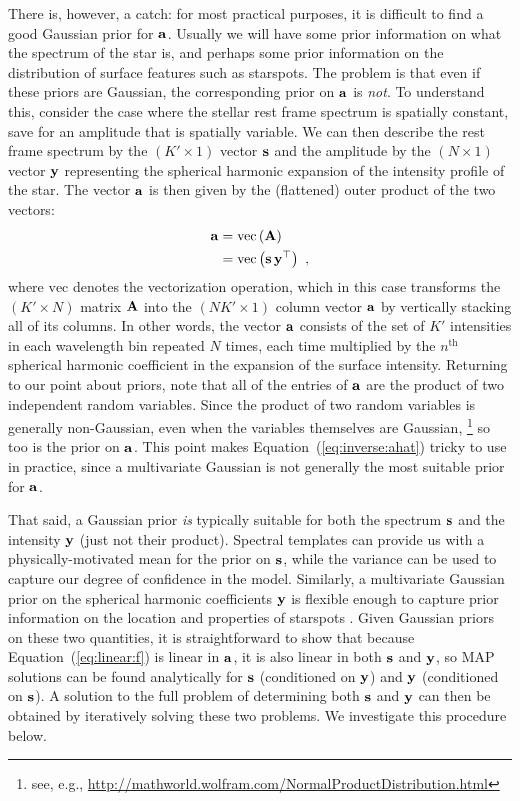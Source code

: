 \documentclass[modern]{aastex631}
\begin{document}
There is, however, a catch: for most practical purposes, it is difficult to find a good Gaussian prior for ${\mathbf{a}}$. 
Usually we will have some prior information on what the spectrum of the star is, and perhaps some prior information on the distribution of surface features such as starspots. 
The problem is that even if these priors are Gaussian, the corresponding prior on ${\mathbf{a}}$ is \emph{not}. 
To understand this, consider the case where the stellar rest frame spectrum is spatially constant, save for an amplitude that is spatially variable. 
We can then describe the rest frame spectrum by the $(K' \times 1)$ vector ${\mathbf{s}}$ and the amplitude by the $(N \times 1)$ vector ${\mathbf{y}}$ representing the spherical harmonic expansion of the intensity profile of the star. 
The vector ${\mathbf{a}}$ is then given by the (flattened) outer product of the two vectors:
%
\begin{align}
    \label{eq:inverse:alm}
    {\ensuremath{\mathbf{a}}} & = \mathrm{vec}\left( {\mathbf{A}} \right) \nonumber             \\
           & = \mathrm{vec}\left( {\mathbf{s}} \, {\mathbf{y}}^\top \right) \hskip 0.33em,
\end{align}
%
where $\mathrm{vec}$ denotes the vectorization operation, which in this case transforms the $(K' \times N)$ matrix ${\mathbf{A}}$ into the $(N K' \times 1)$ column vector ${\mathbf{a}}$ by vertically stacking all of its columns. 
In other words, the vector ${\mathbf{a}}$ consists of the set of $K'$ intensities in each wavelength bin repeated $N$ times, each time multiplied by the $n^\mathrm{th}$ spherical harmonic coefficient in the expansion of the surface intensity. 
Returning to our point about priors, note that all of the entries of ${\mathbf{a}}$ are the product of two independent random variables. 
Since the product of two random variables is generally non-Gaussian, even when the variables themselves are Gaussian,%
\footnote{see, e.g., \url{http://mathworld.wolfram.com/NormalProductDistribution.html}}
so too is the prior on ${\mathbf{a}}$. 
This point makes Equation~(\ref{eq:inverse:ahat}) tricky to use in practice, since a multivariate Gaussian is not generally the most suitable prior for ${\mathbf{a}}$.

That said, a Gaussian prior \emph{is} typically suitable for both the spectrum ${\mathbf{s}}$ and the intensity ${\mathbf{y}}$ (just not their product). 
Spectral templates can provide us with a physically-motivated mean for the prior on ${\mathbf{s}}$, while the variance can be used to capture our degree of confidence in the model.
Similarly, a multivariate Gaussian prior on the spherical harmonic coefficients ${\mathbf{y}}$ is flexible enough to capture prior information on the location and properties of starspots \citep{Luger2021b}.
%
Given Gaussian priors on these two quantities, it is straightforward to show that because Equation~(\ref{eq:linear:f}) is linear in ${\mathbf{a}}$, it is also linear in both ${\mathbf{s}}$ and ${\mathbf{y}}$, so MAP solutions can be found analytically for ${\mathbf{s}}$ (conditioned on ${\mathbf{y}}$) and ${\mathbf{y}}$ (conditioned on ${\mathbf{s}}$).
A solution to the full problem of determining both ${\mathbf{s}}$ and ${\mathbf{y}}$ can then be obtained by iteratively solving these two problems.
We investigate this procedure below.
\end{document}
